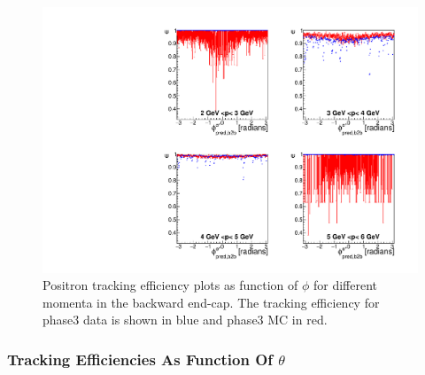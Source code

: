 \documentclass[a4paper,11pt,twosided,final,german,openbib,pdftex,listof=totoc,bibliography=totoc]{scrbook}
\begin{document}
\begin{figure}[!htbp]
	\centering
	\includegraphics[width=\textwidth]{Plots/master3/xPMPhiepECP3}
	\caption[Momentum $\phi$ Positron Backward End-Cap Efficiency Phase3]{Positron tracking efficiency plots as function of $\phi$ for different momenta in the backward end-cap. The tracking efficiency for phase3 data is shown in blue and phase3 MC in red.}
	
	\label{plt:xPMPhiepEC3}
\end{figure}

\newpage

\subsubsection{Tracking Efficiencies As Function Of $\theta$}
\end{document}
